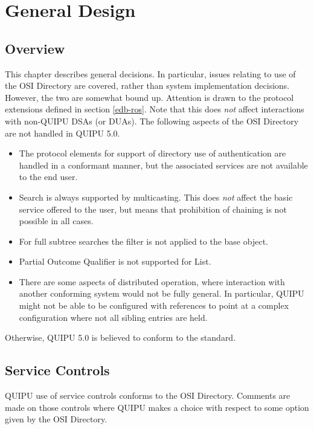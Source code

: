 
\chapter {General Design}

\section {Overview}

This chapter describes general decisions.  
In particular, issues relating to use of
the OSI Directory are covered,
rather than
system implementation decisions.
However, the two are somewhat bound up.
Attention is drawn to the protocol extensions defined in section
\ref{edb-ros}.  Note that this does {\em not} affect interactions with
non-QUIPU DSAs (or DUAs).
The following aspects of the OSI Directory are not handled in QUIPU 5.0.

\begin {itemize}
\item The protocol elements for support of directory use of authentication
are handled in a conformant manner, but the associated services are not
available to the end user.

\item
Search is always supported by multicasting.  This does
{\em not} affect the basic service offered to the user, but means that
prohibition of chaining is not possible in all cases.  

\item For full subtree searches the filter is not applied to the base object.

\item Partial Outcome Qualifier is not supported for List.

\item There are some aspects of distributed operation, where interaction
with another conforming system would not be fully general.  In particular,
QUIPU might not be able to be configured with references to point at a
complex configuration where not all sibling entries are held.  
\end {itemize}

Otherwise, QUIPU 5.0 is believed to conform to the standard.

\section {Service Controls}

QUIPU use of service controls conforms to the OSI Directory.
Comments are made on those
controls where QUIPU makes a choice with respect to some option
given by the OSI Directory.

